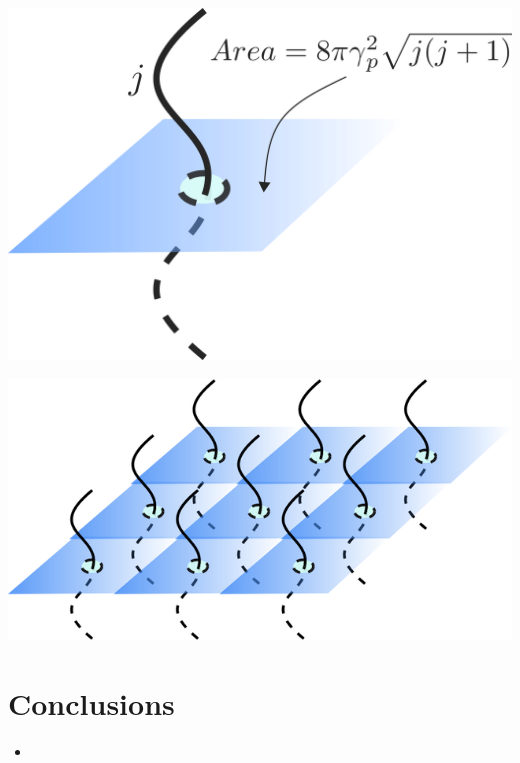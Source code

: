 \documentclass[a0,portrait]{a0poster}
\begin{document}
\begin{multicols}{3}
\begin{minipage}[t]{0.45\linewidth}
	\centering
	\includegraphics[width=0.5\linewidth]{area_puncture}
\end{minipage}
\begin{minipage}[t]{0.45\linewidth}
	\centering
	\includegraphics[width=0.6\linewidth]{area_punctures}
\end{minipage}





\color{SaddleBrown}

\section*{Conclusions}

\begin{itemize}
	\item 
\end{itemize}



\end{multicols}
\end{document}
